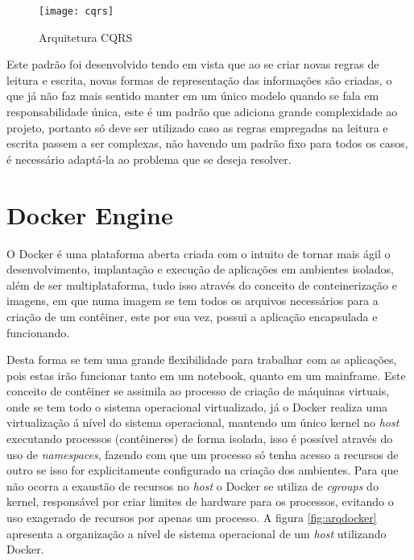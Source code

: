 \begin{figure}[!h]
\caption{\label{fig:cqrs} Arquitetura CQRS}
\begin{center}
\texttt{[image: cqrs]}
\end{center}
\end{figure}

Este padrão foi desenvolvido tendo em vista que ao se criar novas regras de leitura e escrita, novas formas de representação das informações são criadas, o que já não faz mais sentido manter em um único modelo quando se fala em responsabilidade única, este é um padrão que adiciona grande complexidade ao projeto, portanto só deve ser utilizado caso as regras empregadas na leitura e escrita passem a ser complexas, não havendo um padrão fixo para todos os casos, é necessário adaptá-la ao problema que se deseja resolver.~\cite{cqrs}

\section{Docker Engine}
\label{sec:docker}
O Docker é uma plataforma aberta criada com o intuito de tornar mais ágil o desenvolvimento, implantação e execução de aplicações em ambientes isolados, além de ser multiplataforma, tudo isso através do conceito de conteinerização e imagens, em que numa imagem se tem todos os arquivos necessários para a criação de um contêiner, este por sua vez, possui a aplicação encapsulada  e funcionando.

Desta forma se tem uma grande flexibilidade para trabalhar com as aplicações, pois estas irão funcionar tanto em um notebook, quanto em um mainframe. Este conceito de contêiner se assimila ao processo de criação de máquinas virtuais, onde se tem todo o sistema operacional virtualizado, já o Docker realiza uma virtualização á nível do sistema operacional, mantendo um único kernel no \textit{host} executando processos (contêineres) de forma isolada, isso é possível através do uso de \textit{namespaces}, fazendo com que um processo só tenha acesso a recursos de outro se isso for explicitamente configurado na criação dos ambientes. Para que não ocorra a exaustão de recursos no \textit{host} o Docker se utiliza de \textit{cgroups} do kernel, responsável por criar limites de hardware para os processos, evitando o uso exagerado de recursos por apenas um processo. A figura \ref{fig:arqdocker} apresenta a organização a nível de sistema operacional de um \textit{host} utilizando Docker.~\cite{docker}

